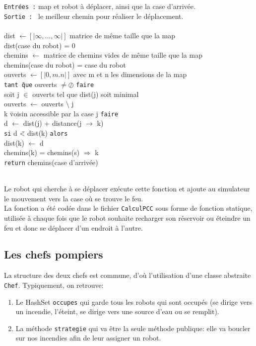 \documentclass[a4paper,8pt]{article} %
\begin{document}
\begin{tabbing}
{\tt Entrées :} map et robot à déplacer, ainsi que la case d'arrivée.\\
{\tt Sortie : } le meilleur chemin pour réaliser le déplacement. \\ \\
dist $\leftarrow [|\infty,...,\infty|]$          matrice de même taille que la map \\
dist(case du robot) = 0\\
chemins $\leftarrow$          matrice de chemins vides de même taille que la map\\
chemins(case du robot) = case du robot \\
ouverts $\leftarrow [|0,m.n|]$          avec m et n les dimensions de la map\\
{\tt tant \= que} ouverts $\neq \oslash$ {\tt faire}\\
\> soit j $\in$ ouverts tel que dist(j) soit minimal\\
\> ouverts $\leftarrow $ ouverts $\setminus$ {j}\\
 k \= voisin accessible par la case j {\tt faire} \\
\>\> d $\leftarrow$ dist(j) + distance(j $\rightarrow$ k)\\
\> \> {\tt si} d \=< dist(k) {\tt alors} \\
\> \> \> dist(k) $\leftarrow$ d\\
\> \> \> chemins(k) = chemins(s) $\Rightarrow$ k\\
{\tt return} chemins(case d'arrivée)
\end{tabbing}
\\ 

Le robot qui cherche à se déplacer exécute cette fonction et ajoute au simulateur le mouvement vers la case où se trouve le feu. \\
La fonction a été codée dans le fichier {\tt CalculPCC} sous forme de fonction statique, utilisée à chaque fois que le robot souhaite
recharger son réservoir ou éteindre un feu et donc se déplacer d'un endroit à l'autre.

\subsection{Les chefs pompiers}
La structure des deux chefs est commune, d'où l'utilisation d'une classe abstraite \texttt{Chef}. Typiquement, on retrouve:
\begin{enumerate}
    \item Le HashSet \texttt{occupes} qui garde tous les robots qui sont occupés (se dirige vers un incendie, l'éteint,
    se dirige vers une source d'eau ou se remplit).
    \item La méthode \texttt{strategie} qui va être la seule méthode publique: elle va boucler sur nos incendies afin de leur assigner un robot.
\end{enumerate}
\end{document}
